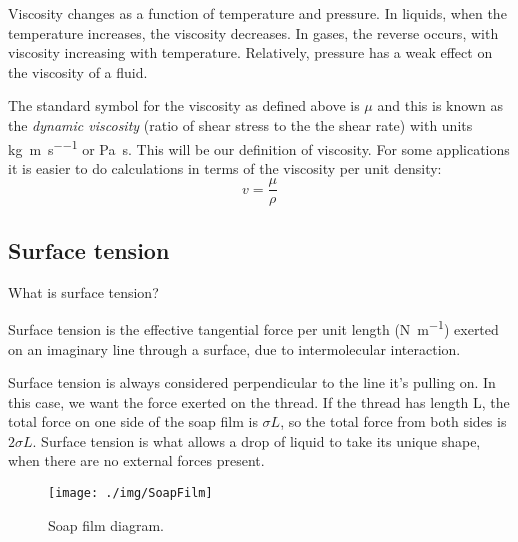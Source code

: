 Viscosity changes as a function of temperature and pressure. In liquids, when the temperature increases, the viscosity decreases. In gases, the reverse occurs, with viscosity increasing with temperature. Relatively, pressure has a weak effect on the viscosity of a fluid.

The standard symbol for the viscosity as defined above is \( \mu \) and this is known as the \emph{dynamic viscosity} (ratio of shear stress to the the shear rate) with units \si{\kg\per\meter\per\second} or \si{\pascal \second}. This will be our definition of viscosity. For some applications it is easier to do calculations in terms of the viscosity per unit density:
\begin{equation}
  v = \frac{\mu}{\rho}
\end{equation}
\subsection{Surface tension}
What is surface tension?
\begin{center}
  Surface tension is the effective tangential force per unit length (\si{\newton\per\meter}) exerted on an imaginary line through a surface, due to intermolecular interaction.
\end{center}
Surface tension is always considered perpendicular to the line it's pulling on. In this case, we want the force exerted on the thread. If the thread has length L, the total force on one side of the soap film is \(\sigma L\), so the total force from both sides is \(2\sigma L\). Surface tension is what allows a drop of liquid to take its unique shape, when there are no external forces present.
\begin{figure}[h!]
  \centering
  \texttt{[image: ./img/SoapFilm]}
  \caption{Soap film diagram.}
\end{figure}
